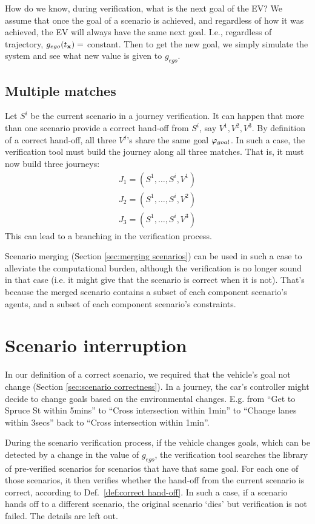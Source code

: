 How do we know, during verification, what is the next goal of the EV?
We assume that once the goal of a scenario is achieved, and regardless of how it was achieved, the EV will always have the same next goal. 
I.e., regardless of trajectory, $g_{ego}(t_{\mathbf{x}}) = $ constant.
Then to get the new goal, we simply simulate the system and see what new value is given to $g_{ego}$.
\subsection{Multiple matches}
Let $S^i$ be the current scenario in a journey verification.
It can happen that more than one scenario provide a correct hand-off from $S^i$, say $V^1,V^2,V^3$.
By definition of a correct hand-off, all three $V^j$'s share the same goal $\varphi_{goal}$.
In such a case, the verification tool must build the journey along all three matches. That is, it must now build three journeys:
\begin{eqnarray*}
J_1  = (S^1,\ldots,S^i,V^1)
\\
J_2  = (S^1,\ldots,S^i,V^2)
\\
J_3  = (S^1,\ldots,S^i,V^3)
\end{eqnarray*}
This can lead to a branching in the verification process. 

Scenario merging (Section \ref{sec:merging scenarios}) can be used in such a case to alleviate the computational burden, although the verification is no longer sound in that case (i.e. it might give that the scenario is correct when it is not). 
That's because the merged scenario contains a subset of each component scenario's agents, and a subset of each component scenario's constraints.
 
\section{Scenario interruption}
\label{sec:scenario interruption}
In our definition of a correct scenario, we required that the vehicle's goal not change (Section \ref{sec:scenario correctness}).
In a journey, the car's controller might decide to change goals based on the environmental changes. 
E.g. from ``Get to Spruce St within 5mins'' to ``Cross intersection within 1min'' to ``Change lanes within 3secs'' back to ``Cross intersection within 1min''.

During the scenario verification process, if the vehicle changes goals, which can be detected by a change in the value of $g_{ego}$, the verification tool searches the library of pre-verified scenarios for scenarios that have that same goal. 
For each one of those scenarios, it then verifies whether the hand-off from the current scenario is correct, according to Def.~\ref{def:correct hand-off}.
In such a case, if a scenario hands off to a different scenario, the original scenario `dies' but verification is not failed.
The details are left out.


